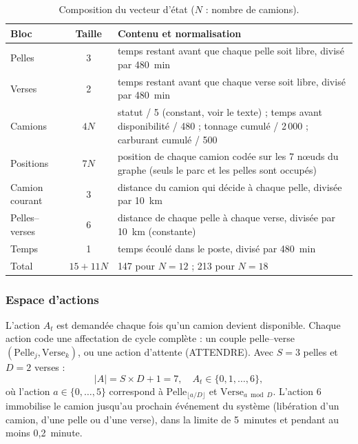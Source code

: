 \documentclass[11pt,a4paper]{article}
\newif\ifrevmarks
\newcommand{\revtag}[1]{\ifrevmarks\textsuperscript{\textcolor{red!70!black}{\scriptsize[#1]}}\fi}
\newcommand{\rev}[2]{\ifrevmarks{\color{revcolor}#2}\revtag{#1}\else#2\fi}
\begin{document}
\begin{table}[H]
\centering
\caption{\rev{M1, N1, N2}{Composition du vecteur d'état ($N$ : nombre de camions).}}
\label{tab:state}
\footnotesize
\begin{tabularx}{\textwidth}{lcX}
\toprule
\textbf{Bloc} & \textbf{Taille} & \textbf{Contenu et normalisation} \\
\midrule
Pelles & 3 & temps restant avant que chaque pelle soit libre, divisé par 480~min \\
Verses & 2 & temps restant avant que chaque verse soit libre, divisé par 480~min \\
Camions & $4N$ & statut / 5 (constant, voir le texte) ; temps avant disponibilité / 480 ; tonnage cumulé / 2\,000 ; carburant cumulé / 500 \\
Positions & $7N$ & position de chaque camion codée sur les 7 nœuds du graphe (seuls le parc et les pelles sont occupés) \\
Camion courant & 3 & distance du camion qui décide à chaque pelle, divisée par 10~km \\
Pelles--verses & 6 & distance de chaque pelle à chaque verse, divisée par 10~km (constante) \\
Temps & 1 & temps écoulé dans le poste, divisé par 480~min \\
\midrule
Total & $15+11N$ & 147 pour $N=12$ ; 213 pour $N=18$ \\
\bottomrule
\end{tabularx}
\end{table}

\subsubsection{Espace d'actions}

L'action $A_t$ est demandée chaque fois qu'un camion devient disponible. Chaque action code une affectation de cycle complète : un couple pelle--verse $(\text{Pelle}_j, \text{Verse}_k)$, ou une action d'attente (ATTENDRE). Avec $S=3$ pelles et $D=2$ verses :
\begin{equation}
  |A| = S \times D + 1 = 7,
  \quad A_t \in \{0, 1, \dots, 6\},
\end{equation}
où l'action $a \in \{0,\dots,5\}$ correspond à $\text{Pelle}_{\lfloor a/D \rfloor}$ et $\text{Verse}_{a \bmod D}$. \rev{M11}{L'action 6 immobilise le camion jusqu'au prochain événement du système (libération d'un camion, d'une pelle ou d'une verse), dans la limite de 5~minutes et pendant au moins 0,2~minute.}
\end{document}
